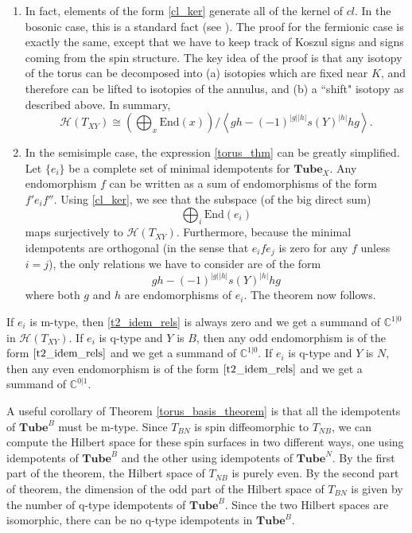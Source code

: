 \documentclass[12pt,a4paper]{article}
\newcommand{\cc}{\mathbb{C}}
\newcommand{\mch}{\mathcal{H}}
\newcommand\be            {\begin{equation}}
\newcommand\ee            {\end{equation}}
\newcommand{\End}{\text{End}}
\newcommand{\tube}{\textbf{Tube}}
\begin{document}
\begin{enumerate}
\item In fact, elements of the form \eqref{cl_ker} generate all of the kernel of $cl$.
In the bosonic case, this is a standard fact (see \cite{walker2006}).
The proof for the fermionic case is exactly the same, except that we have to keep track of
Koszul signs and signs coming from the spin structure.
The key idea of the proof is that any isotopy of the torus can be decomposed into (a) isotopies which
are fixed near $K$, and therefore can be lifted to isotopies of the annulus, and (b) a ``shift" isotopy
as described above.
In summary,
\be \label{torus_thm}
	\mch(T_{XY}) \cong \left( \bigoplus_x \End(x) \right) / \left\langle gh - (-1)^{|g| |h|} s(Y)^{|h|} hg \right\rangle .
\ee

\item In the semisimple case, the expression \eqref{torus_thm} can be greatly simplified.
Let $\{e_i\}$ be a complete set of minimal idempotents for $\tube_X$.
Any endomorphism $f$ can be written as a sum of endomorphisms of the form $f' e_i f''$.
Using \eqref{cl_ker}, we see that the subspace (of the big direct sum)
\be
	\bigoplus_i \End(e_i)
\ee
maps surjectively to $\mch(T_{XY})$.
Furthermore, because the minimal idempotents are orthogonal (in the sense that $e_i f e_j$ is zero for any $f$ unless $i=j$),
the only relations we have to consider are of the form
\be \label{t2_idem_rels}
	gh - (-1)^{|g| |h|} s(Y)^{|h|} hg
\ee
where both $g$ and $h$ are endomorphisms of $e_i$.
The theorem now follows.
\end{enumerate}

If $e_i$ is m-type, then \eqref{t2_idem_rels} is always zero and we get a summand of $\cc^{1|0}$ in $\mch(T_{XY})$.
If $e_i$ is q-type and $Y$ is $B$, then any odd endomorphism is of the form $\eqref{t2_idem_rels}$
and we get a summand of $\cc^{1|0}$.
If $e_i$ is q-type and $Y$ is $N$, then any even endomorphism is of the form $\eqref{t2_idem_rels}$
and we get a summand of $\cc^{0|1}$.

A useful corollary of Theorem \ref{torus_basis_theorem} is that all the idempotents of 
$\tube^B$ must be m-type.
Since $T_{BN}$ is spin diffeomorphic to $T_{NB}$, we can compute the Hilbert space for 
these spin surfaces in two different ways, one using
idempotents of $\tube^B$ and the other using idempotents of $\tube^N$.
By the first part of the theorem, the Hilbert space of $T_{NB}$ is purely even.
By the second part of theorem, the dimension of the odd part of the Hilbert space of $T_{BN}$
is given by the number of q-type idempotents of $\tube^B$.
Since the two Hilbert spaces are isomorphic, there can be no q-type idempotents in $\tube^B$.
\end{document}
